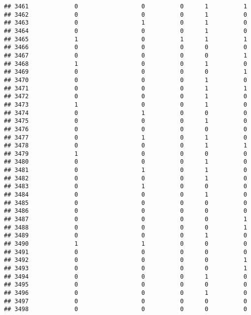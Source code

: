 \documentclass[
]{article}
\begin{document}
\begin{verbatim}
## 3461             0                  0          0      1          1
## 3462             0                  0          0      1          0
## 3463             0                  1          0      1          0
## 3464             0                  0          0      1          0
## 3465             1                  0          1      1          1
## 3466             0                  0          0      0          0
## 3467             0                  0          0      0          1
## 3468             1                  0          0      1          0
## 3469             0                  0          0      0          1
## 3470             0                  0          0      1          0
## 3471             0                  0          0      1          1
## 3472             0                  0          0      1          0
## 3473             1                  0          0      1          0
## 3474             0                  1          0      0          0
## 3475             0                  0          0      1          0
## 3476             0                  0          0      0          0
## 3477             0                  1          0      1          0
## 3478             0                  0          0      1          1
## 3479             1                  0          0      0          0
## 3480             0                  0          0      1          0
## 3481             0                  1          0      1          0
## 3482             0                  0          0      1          0
## 3483             0                  1          0      0          0
## 3484             0                  0          0      1          0
## 3485             0                  0          0      0          0
## 3486             0                  0          0      0          0
## 3487             0                  0          0      0          1
## 3488             0                  0          0      0          1
## 3489             0                  0          0      1          0
## 3490             1                  1          0      0          0
## 3491             0                  0          0      0          0
## 3492             0                  0          0      0          1
## 3493             0                  0          0      0          1
## 3494             0                  0          0      1          0
## 3495             0                  0          0      0          0
## 3496             0                  0          0      1          0
## 3497             0                  0          0      0          0
## 3498             0                  0          0      0          0

\end{verbatim}
\end{document}
